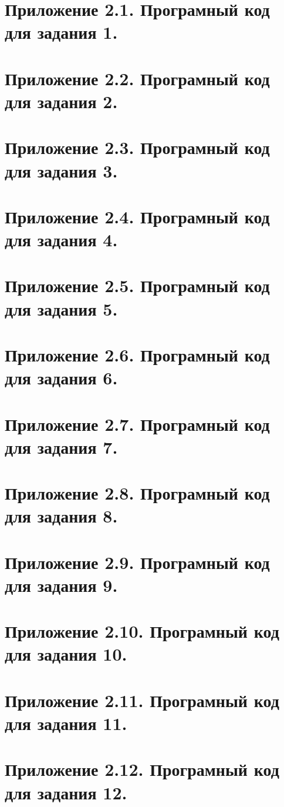 \documentclass[oneside,a4paper,14pt]{extarticle}
\begin{document}
\setcounter{page}{24}
\newpage\thispagestyle{plain}
\section*{Приложение 2.1. Програмный код для задания 1.}
\pagebreak
\section*{Приложение 2.2. Програмный код для задания 2.}
\pagebreak
\section*{Приложение 2.3. Програмный код для задания 3.}
\pagebreak
\section*{Приложение 2.4. Програмный код для задания 4.}
\section*{Приложение 2.5. Програмный код для задания 5.}
\pagebreak
\section*{Приложение 2.6. Програмный код для задания 6.}
\pagebreak
\section*{Приложение 2.7. Програмный код для задания 7.}
\pagebreak
\section*{Приложение 2.8. Програмный код для задания 8.}
\pagebreak
\section*{Приложение 2.9. Програмный код для задания 9.}
\pagebreak
\section*{Приложение 2.10. Програмный код для задания 10.}
\pagebreak
\section*{Приложение 2.11. Програмный код для задания 11.}
\pagebreak
\section*{Приложение 2.12. Програмный код для задания 12.}
\end{document}
